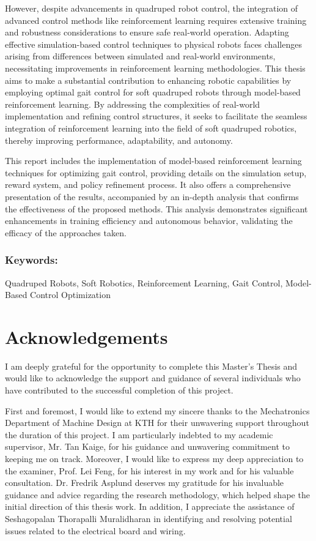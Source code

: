 However, despite advancements in quadruped robot control, the integration of advanced control methods like reinforcement learning requires extensive training and robustness considerations to ensure safe real-world operation. Adapting effective simulation-based control techniques to physical robots faces challenges arising from differences between simulated and real-world environments, necessitating improvements in reinforcement learning methodologies. This thesis aims to make a substantial contribution to enhancing robotic capabilities by employing optimal gait control for soft quadruped robots through model-based reinforcement learning. By addressing the complexities of real-world implementation and refining control structures, it seeks to facilitate the seamless integration of reinforcement learning into the field of soft quadruped robotics, thereby improving performance, adaptability, and autonomy.

This report includes the implementation of model-based reinforcement learning techniques for optimizing gait control, providing details on the simulation setup, reward system, and policy refinement process. It also offers a comprehensive presentation of the results, accompanied by an in-depth analysis that confirms the effectiveness of the proposed methods. This analysis demonstrates significant enhancements in training efficiency and autonomous behavior, validating the efficacy of the approaches taken.

\vspace{2ex}
\subsection*{Keywords:}
Quadruped Robots, Soft Robotics, Reinforcement Learning, Gait Control, Model-Based Control Optimization




\newpage
\chapter*{Acknowledgements}
I am deeply grateful for the opportunity to complete this Master's Thesis and would like to acknowledge the support and guidance of several individuals who have contributed to the successful completion of this project.

First and foremost, I would like to extend my sincere thanks to the Mechatronics Department of Machine Design at KTH for their unwavering support throughout the duration of this project. I am particularly indebted to my academic supervisor, Mr. Tan Kaige, for his guidance and unwavering commitment to keeping me on track. Moreover, I would like to express my deep appreciation to the examiner, Prof. Lei Feng, for his interest in my work and for his valuable consultation. Dr. Fredrik Asplund deserves my gratitude for his invaluable guidance and advice regarding the research methodology, which helped shape the initial direction of this thesis work. In addition, I appreciate the assistance of Seshagopalan Thorapalli Muralidharan in identifying and resolving potential issues related to the electrical board and wiring. 

